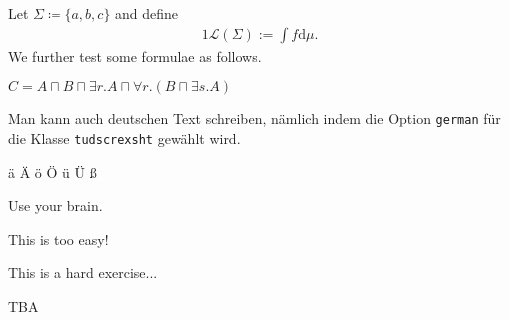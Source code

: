\documentclass{tudscrexsht} %
\author{Some professor, an assistant}
\date{18.04.2342}
\begin{document}
\begin{exercise}
  Let $\Sigma\coloneqq\{a,b,c\}$ and define
  \begin{alignat*}{1}
    \mathcal{L}(\Sigma):=\int f\mathrm{d}\mu.
  \end{alignat*}
  We further test some formulae as follows.

  $C=A\sqcap B\sqcap\exists r.A\sqcap\forall r.(B\sqcap\exists s.A)$

  Man kann auch deutschen Text schreiben, nämlich indem die Option \texttt{german} für die Klasse \texttt{tudscrexsht} gewählt wird.

  ä Ä ö Ö ü Ü ß
\end{exercise}

\begin{hint*}
  Use your brain.
\end{hint*}

\begin{hint}
  This is too easy!
\end{hint}

\begin{exercise*}
  This is a hard exercise...
\end{exercise*}

\begin{solution}
  TBA
\end{solution}
\end{document}
